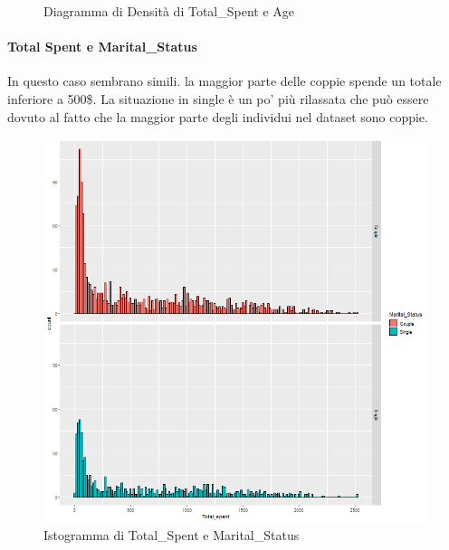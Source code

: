 \documentclass[letterpaper,11pt]{article}
\begin{document}
\begin{figure}[h]
\begin{minipage}[b]{0.4\textwidth}
    \caption{Diagramma di Densità di Total\_Spent e Age}
     \label{fig:DensitaTsAge}
  \end{minipage}
\end{figure}



\newpage
\paragraph{Total Spent e Marital\_Status}
In questo caso sembrano simili. la maggior parte delle coppie spende un totale inferiore a 500\$.
La situazione in single è un po' più rilassata che può essere dovuto al fatto che la maggior parte degli individui nel dataset sono coppie.


\begin{figure}[h]
  \centering
  \begin{minipage}[b]{0.4\textwidth}
    \includegraphics[width=\textwidth]{Img/EDA/EDA026.png}
    \caption{Istogramma di Total\_Spent e Marital\_Status}
    \label{fig:IstogrammaTsMaritalStatus}
  \end{minipage}
  \hfill
  \begin{minipage}[b]{0.4\textwidth}

\end{minipage}
\end{figure}
\end{document}
